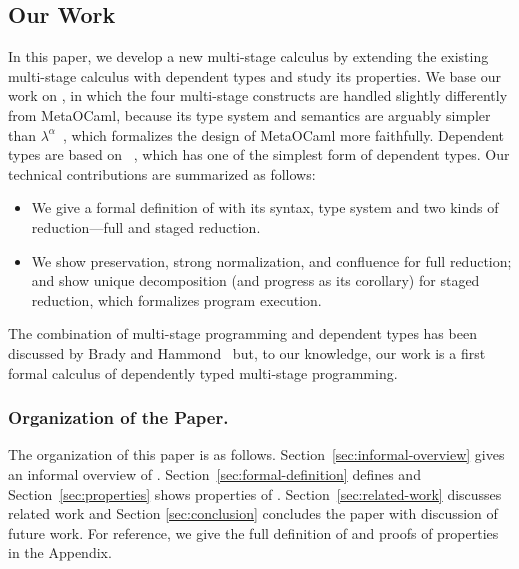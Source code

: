 
\subsection{Our Work}
In this paper, we develop a new multi-stage calculus \LMD by extending
the existing multi-stage calculus \LTP\cite{Hanada2014} with dependent
types and study its properties.  We base our work on \LTP, in which
the four multi-stage constructs are handled slightly differently from
MetaOCaml, because its type system and semantics are arguably simpler
than \(\lambda^\alpha\)~\cite{taha2003environment}, which formalizes
the design of MetaOCaml more faithfully.  Dependent types are based on
\LLF~\cite{attapl}, which has one of the simplest form of dependent
types.  Our technical contributions are summarized as follows:
\begin{itemize}
\item We give a formal definition of \LMD with its syntax, 
  type system and two kinds of reduction---full and staged reduction.
\item We show preservation, strong normalization, and confluence for
  full reduction; and show unique decomposition (and progress as its
  corollary) for staged reduction, which formalizes program execution.
\end{itemize}
The combination of multi-stage programming and dependent types has
been discussed by Brady and Hammond~\cite{brady2006dependently} but,
to our knowledge, our work is a first formal calculus of dependently
typed multi-stage programming.  

\subsubsection{Organization of the Paper.}

The organization of this paper is as follows.
Section~\ref{sec:informal-overview} gives an informal overview of
\LMD.  Section~\ref{sec:formal-definition} defines \LMD and
Section~\ref{sec:properties} shows properties of \LMD.
Section~\ref{sec:related-work} discusses related work and Section
\ref{sec:conclusion} concludes the paper with discussion of future
work.  For reference, we give the full definition of \LMD and
 proofs of properties in the Appendix.